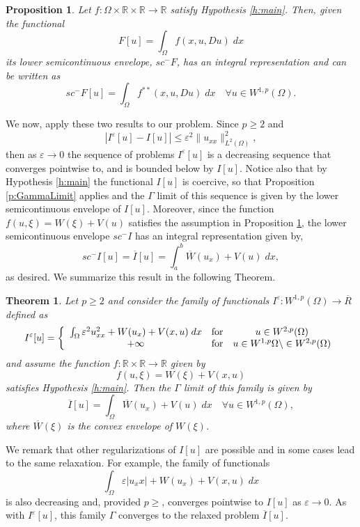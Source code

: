 \documentclass[11pt]{article}
\newcommand{\eps}{\varepsilon}
\newcommand{\R}{\mathbb{R}}
\theoremstyle{plain}
\newtheorem{Theorem}{Theorem}
\newtheorem{Proposition}[Lemma]{Proposition}
\begin{document}
\begin{Proposition}\label{p:relaxation}
Let $f: \Omega \times \R \times \R \rightarrow \R$  satisfy Hypothesis \ref{h:main}.
Then, given the functional
\[ F[u] = \int_\Omega f(x,u, Du) \;dx\]
its lower semicontinuous envelope, $sc^-F$, has an integral representation and can be written as
\[ sc^-F[u] = \int_\Omega f^{**}(x,u,Du) \;dx\quad \forall u \in W^{1,p}(\Omega).\]
\end{Proposition}

We now, apply these two results to our problem. Since $p\geq 2$ and
\[ \left | I^\eps[u] - I[u] \right| \leq \eps^2 \|u_{xx}\|^2_{L^2(\Omega)},\]
 then as $\eps \rightarrow 0$ the sequence of problems $I^\eps[u]$ is a decreasing sequence that converges pointwise to, and is bounded below by $I[u]$. Notice also that by Hypothesis \ref{h:main} the functional $I[u]$ is coercive, so that Proposition  \ref{p:GammaLimit} applies and  the $\Gamma$ limit of this sequence is given by the lower semicontinuous envelope of $I[u]$. Moreover, since the function $f(u, \xi) = W(\xi) + V(u)$ satisfies the assumption in Proposition \ref{p:relaxation},  the lower semicontinuous envelope $sc^-I$ has an integral representation given by, 
\[ sc^-I[u] = \overline{I}[u] = \int_a^b \overline{W}(u_x) + V(u) \;dx, \]
as desired. We summarize this result in the following Theorem.

\begin{Theorem}\label{p:GammaConv}
Let $p \geq 2$ and consider the family of functionals $I^\eps:  W^{1,p}(\Omega) \rightarrow \overline{R}$ defined as
\[ I^\eps[u] = \left \{ 
\begin{array}{c c c}
\int_\Omega \eps^2u_{xx}^2 + W(u_x) + V(x,u)  \;dx& \mbox{for} & u \in W^{2,p}(\Omega)\\
+\infty & \mbox{for} & u \in W^{1,p}\Omega \backslash \in W^{2,p}(\Omega)
\end{array} \right.
\]
and assume the function $f:  \R \times \R \rightarrow \R$ given by
\[ f(u, \xi ) = W(\xi) + V(x,u) \]
satisfies Hypothesis \ref{h:main}. Then the $\Gamma$ limit of this family is given by
\[ \overline{I} [u] = \int_\Omega \overline{W}(u_x) + V(u) \;dx\quad \forall u \in W^{1,p}(\Omega),\]
where $\overline{W}(\xi)$ is the convex envelope of $W(\xi)$.
\end{Theorem}

We remark that other regularizations of $I[u]$ are possible and in some cases lead to the same relaxation. For example, the family of functionals
\[ \int_\Omega \eps |u_xx| + W(u_x) + V(x, u)\;dx\]
 is also decreasing and, provided $p\geq $, converges pointwise to $I[u]$ as $\eps \to 0$. As with $I^\eps[u]$, this family $\Gamma$ converges to the relaxed problem $\overline{I}[u]$. 
\end{document}

